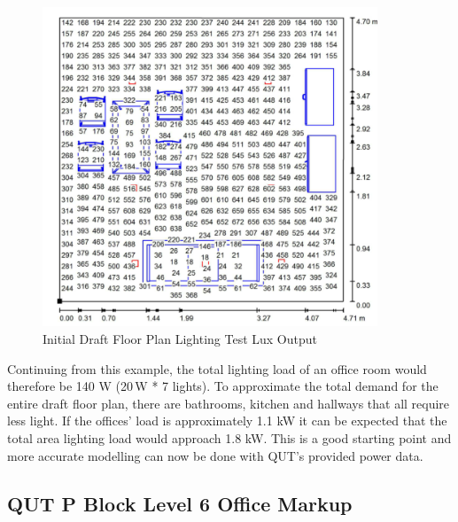 \begin{figure}[H]
	\hfill\includegraphics[width = 100mm]{images/lighting_draft_output}\hspace*{\fill}
	\caption{Initial Draft Floor Plan Lighting Test Lux Output} 
	\label{fig:DraftLightingLux}
\end{figure} 

Continuing from this example, the total lighting load of an office room would therefore be 140 W (20\,W * 7 lights). To approximate the total demand for the entire draft floor plan, there are bathrooms, kitchen and hallways that all require less light. If the offices' load is approximately 1.1 kW it can be expected that the total area lighting load would approach 1.8 kW. This is a good starting point and more accurate modelling can now be done with QUT's provided power data. 





\newpage

\subsection{QUT P Block Level 6 Office Markup}
\label{appendix:qut_lvl6_markup}



